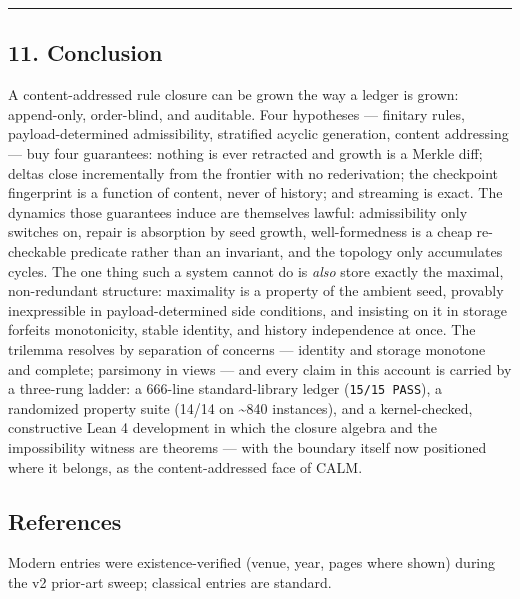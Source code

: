 \documentclass[
  10pt,
]{article}
\begin{document}
\begin{center}\rule{0.5\linewidth}{0.5pt}\end{center}

\hypertarget{conclusion}{%
\subsection{11. Conclusion}\label{conclusion}}

A content-addressed rule closure can be grown the way a ledger is grown:
append-only, order-blind, and auditable. Four hypotheses --- finitary
rules, payload-determined admissibility, stratified acyclic generation,
content addressing --- buy four guarantees: nothing is ever retracted
and growth is a Merkle diff; deltas close incrementally from the
frontier with no rederivation; the checkpoint fingerprint is a function
of content, never of history; and streaming is exact. The dynamics those
guarantees induce are themselves lawful: admissibility only switches on,
repair is absorption by seed growth, well-formedness is a cheap
re-checkable predicate rather than an invariant, and the topology only
accumulates cycles. The one thing such a system cannot do is \emph{also}
store exactly the maximal, non-redundant structure: maximality is a
property of the ambient seed, provably inexpressible in
payload-determined side conditions, and insisting on it in storage
forfeits monotonicity, stable identity, and history independence at
once. The trilemma resolves by separation of concerns --- identity and
storage monotone and complete; parsimony in views --- and every claim in
this account is carried by a three-rung ladder: a 666-line
standard-library ledger (\texttt{15/15\ PASS}), a randomized property
suite (14/14 on \textasciitilde840 instances), and a kernel-checked,
constructive Lean 4 development in which the closure algebra and the
impossibility witness are theorems --- with the boundary itself now
positioned where it belongs, as the content-addressed face of CALM.

\hypertarget{references}{%
\subsection{References}\label{references}}

Modern entries were existence-verified (venue, year, pages where shown)
during the v2 prior-art sweep; classical entries are standard.
\end{document}
